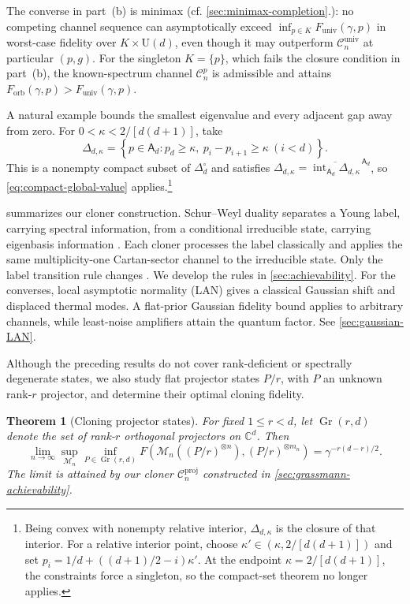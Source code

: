 \documentclass[11pt]{article}
\newtheorem{theorem}{Theorem}[section]
\theoremstyle{remark}
\theoremstyle{plain}
\newcommand{\C}{\mathbb C}
\newcommand{\cC}{\mathcal C}
\newcommand{\cM}{\mathcal M}
\newcommand{\U}{\mathrm U}
\newcommand{\Gr}{\operatorname{Gr}}
\newcommand{\ot}{\otimes}
\newcommand{\Forb}{F_{\mathrm{orb}}}
\newcommand{\Funiv}{F_{\mathrm{univ}}}
\begin{document}
The converse in part~\textup{(b)} is minimax (cf.
\cref{sec:minimax-completion}.): no competing channel sequence
can asymptotically exceed \(\inf_{p\in K}\Funiv(\gamma,p)\) in worst-case
fidelity over \(K\times\U(d)\), even though it may outperform
\(\cC_n^{\mathrm{univ}}\) at particular \((p,g)\).
For the singleton \(K=\{p\}\), which fails the closure condition in
part~\textup{(b)}, the known-spectrum channel \(\cC_n^p\) is admissible
and attains \(\Forb(\gamma,p)>\Funiv(\gamma,p)\). 

A natural example bounds the smallest eigenvalue and every adjacent gap
away from zero.  For \(0<\kappa<2/[d(d+1)]\), take
\[
  \Delta_{d,\kappa}
  =\left\{p\in\mathsf A_d:p_d\ge\kappa,\
    p_i-p_{i+1}\ge\kappa\ (i<d)\right\}.
\]
This is a nonempty compact subset of \(\Delta_d^\circ\) and satisfies
\(\Delta_{d,\kappa}
=\overline{\operatorname{int}_{\mathsf A_d}\Delta_{d,\kappa}}
^{\,\mathsf A_d}\),
so \eqref{eq:compact-global-value} applies.\footnote{Being convex with
nonempty relative interior, \(\Delta_{d,\kappa}\) is the closure of that
interior.  For a relative interior point,
choose \(\kappa'\in(\kappa,2/[d(d+1)])\) and set
\(p_i=1/d+((d+1)/2-i)\kappa'\).  At the endpoint
\(\kappa=2/[d(d+1)]\), the constraints force a singleton, so the
compact-set theorem no longer applies.}

 summarizes our cloner construction.
Schur--Weyl duality separates a Young label, carrying spectral information,
from a conditional irreducible state, carrying eigenbasis information
\cite{KeylWerner2001Spectrum}.  Each cloner processes the label classically
and applies the same multiplicity-one Cartan-sector channel to the
irreducible state. Only the label transition rule changes
\cite{ParthasarathyRangaRaoVaradarajan1967,FultonHarris1991}.
We develop the rules in \cref{sec:achievability}.  For the converses,
local asymptotic normality (LAN) gives a classical Gaussian shift and
displaced thermal modes.  A flat-prior Gaussian fidelity bound applies to
arbitrary channels, while least-noise amplifiers attain the quantum factor.
See \cref{sec:gaussian-LAN}.

Although the preceding results do not cover rank-deficient or spectrally degenerate states, we also study flat projector states \(P/r\), with
\(P\) an unknown rank-\(r\) projector, and determine their optimal cloning fidelity.

\begin{theorem}[Cloning projector states]
\label{thm:grassmann}
For fixed \(1\le r<d\), let \(\Gr(r,d)\) denote the set of rank-\(r\)
orthogonal projectors on \(\C^d\).  Then
\begin{equation}\label{eq:grassmann-value}
  \lim_{n\to\infty}\sup_{\cM_n}\inf_{P\in\Gr(r,d)}
  F\!\left(\cM_n((P/r)^{\ot n}),(P/r)^{\ot m_n}\right)
  =\gamma^{-r(d-r)/2}.
\end{equation}
The limit is attained by our cloner \(\cC_n^{\mathrm{proj}}\) constructed in \cref{sec:grassmann-achievability}.
\end{theorem}
\end{document}
